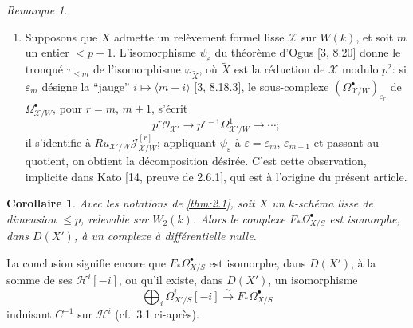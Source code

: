 \documentclass[12pt,a4paper]{article}
\theoremstyle{plain}
\newtheorem{corollary}[theorem]{Corollaire}
\theoremstyle{definition}
\theoremstyle{remark}
\newtheorem{remark}[theorem]{Remarque}
\newcommand{\cO}{\mathcal{O}}
\begin{document}
\begin{remark}
\begin{enumerate}[label=(\roman*)]
\item Supposons que $X$ admette un rel\`evement formel lisse $\mathscr{X}$ sur $W(k)$, et soit $m$ un entier $< p-1$. L'isomorphisme $\psi_\varepsilon$ du th\'eor\`eme d'Ogus [3, 8.20] donne le tronqu\'e $\tau_{\le m}$ de l'isomorphisme $\varphi_{\tilde{X}}$, o\`u $\tilde{X}$ est la r\'eduction de $\mathscr{X}$ modulo $p^2$: si $\varepsilon_m$ d\'esigne la ``jauge'' $i \mapsto \langle m-i \rangle$ [3, 8.18.3], le sous-complexe $(\Omega^{\bullet}_{\mathscr{X}/W})_{\varepsilon_r}$ de $\Omega^{\bullet}_{\mathscr{X}/W}$, pour $r = m$, $m+1$, s'\'ecrit
\[
p^r \cO_{\mathscr{X}'} \to p^{r-1} \Omega^1_{\mathscr{X}'/W} \to \cdots;
\]
il s'identifie \`a $Ru_{\mathscr{X}'/W} \mathscr{J}^{[r]}_{\mathscr{X}/W}$; appliquant $\psi_\varepsilon$ \`a $\varepsilon = \varepsilon_m$, $\varepsilon_{m+1}$ et passant au quotient, on obtient la d\'ecomposition d\'esir\'ee. C'est cette observation, implicite dans Kato [14, preuve de 2.6.1], qui est \`a l'origine du pr\'esent article.
\end{enumerate}
\end{remark}

\begin{corollary}\label{cor:2.3}
Avec les notations de \ref{thm:2.1}, soit $X$ un $k$-sch\'ema lisse de dimension $\le p$, relevable sur $W_2(k)$. Alors le complexe $F_* \Omega^{\bullet}_{X/S}$ est isomorphe, dans $D(X')$, \`a un complexe \`a diff\'erentielle nulle.
\end{corollary}

La conclusion signifie encore que $F_* \Omega^{\bullet}_{X/S}$ est isomorphe, dans $D(X')$, \`a la somme de ses $\mathscr{H}^i[-i]$, ou qu'il existe, dans $D(X')$, un isomorphisme
\[
\bigoplus_i \Omega^i_{X'/S}[-i] \xrightarrow{\sim} F_* \Omega^{\bullet}_{X/S}
\]
induisant $C^{-1}$ sur $\mathscr{H}^i$ (cf.~3.1 ci-apr\`es).
\end{document}

